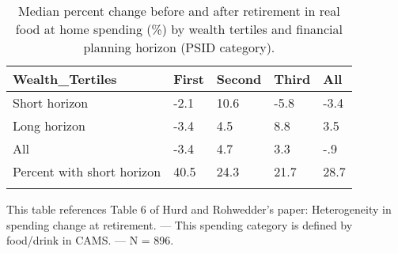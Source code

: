 \begin{table}[tbp] \centering
{}

\caption{Median percent change before and after retirement in real food at home spending (\%) by wealth tertiles and financial planning horizon (PSID category).}
\begin{tabularx}{\textwidth}{lCCCC}

\toprule
{Wealth\_Tertiles}&{First}&{Second}&{Third}&{All} \tabularnewline
\midrule\addlinespace[1.5ex]
Short horizon&-2.1&10.6&-5.8&-3.4 \tabularnewline
Long horizon&-3.4&4.5&8.8&3.5 \tabularnewline
All&-3.4&4.7&3.3&-.9 \tabularnewline
Percent with short horizon&40.5&24.3&21.7&28.7 \tabularnewline
\bottomrule \addlinespace[1.5ex]

\end{tabularx}
\begin{flushleft}
\footnotesize This table references Table 6 of Hurd and Rohwedder's paper: Heterogeneity in spending change at retirement. \linebreak --- \linebreak This spending category is defined by food/drink in CAMS. \linebreak --- \linebreak N = 896.
\end{flushleft}
\end{table}
